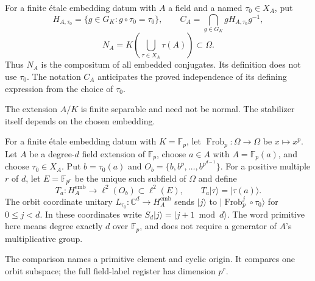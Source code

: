 \begin{definition}
For a finite \'etale embedding datum with $A$ a field and a named
$\tau_0\in X_A$, put
\[
 H_{A,\tau_0}=\{g\in G_K:g\circ\tau_0=\tau_0\},\qquad
 C_A=\bigcap_{g\in G_K}gH_{A,\tau_0}g^{-1},
\]
\[
 N_A=K\left(\bigcup_{\tau\in X_A}\tau(A)\right)\subset\Omega.
\]
Thus $N_A$ is the compositum of all embedded conjugates. Its definition
does not use $\tau_0$. The notation $C_A$ anticipates the proved independence
of its defining expression from the choice of $\tau_0$.
\end{definition}
\begin{scope}
The extension $A/K$ is finite separable and need not be normal. The
stabilizer itself depends on the chosen embedding.
\end{scope}

\begin{definition}
For a finite \'etale embedding datum with $K=\mathbb F_p$, let
$\operatorname{Frob}_p:\Omega\to\Omega$ be $x\mapsto x^p$. Let $A$
be a degree-$d$ field extension of $\mathbb F_p$, choose $a\in A$ with
$A=\mathbb F_p(a)$, and choose $\tau_0\in X_A$. Put $b=\tau_0(a)$ and
$O_b=\{b,b^p,\ldots,b^{p^{d-1}}\}$. For a positive multiple $r$ of $d$,
let $E=\mathbb F_{p^r}$ be the unique such subfield of $\Omega$ and define
\[
 T_a:H_A^{\mathrm{emb}}\longrightarrow\ell^2(O_b)\subset\ell^2(E),
 \qquad T_a|\tau\rangle=|\tau(a)\rangle.
\]
The orbit coordinate unitary $L_{\tau_0}:\mathbb C^d\to H_A^{\mathrm{emb}}$
sends $|j\rangle$ to $|\operatorname{Frob}_p^j\circ\tau_0\rangle$ for
$0\leq j<d$. In these coordinates write $S_d|j\rangle=|j+1\bmod d\rangle$.
The word primitive here means degree exactly $d$ over $\mathbb F_p$, and
does not require a generator of $A$'s multiplicative group.
\end{definition}
\begin{scope}
The comparison names a primitive element and cyclic origin. It compares
one orbit subspace; the full field-label register has dimension $p^r$.
\end{scope}

